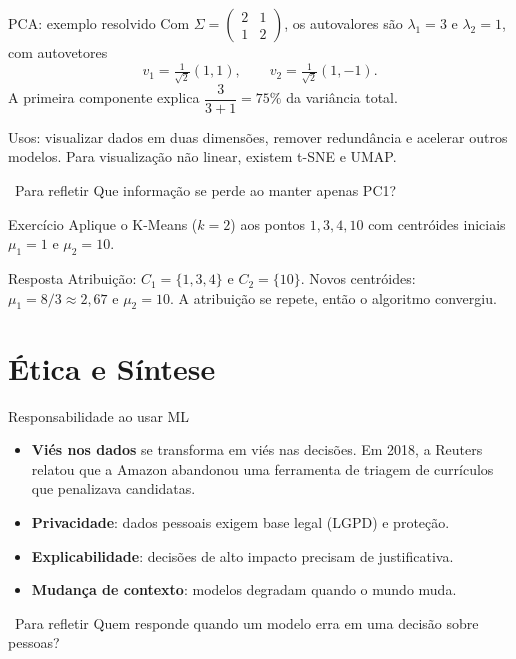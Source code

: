 \documentclass[10pt]{beamer}
\newenvironment{reflexao}{\begin{exampleblock}{\faQuestionCircle\ Para refletir}}{\end{exampleblock}}
\begin{document}
\begin{frame}{PCA: exemplo resolvido}
Com $\Sigma=\begin{pmatrix}2&1\\1&2\end{pmatrix}$, os autovalores são $\lambda_1=3$ e $\lambda_2=1$, com autovetores
\[ v_1=\tfrac{1}{\sqrt2}(1,1), \qquad v_2=\tfrac{1}{\sqrt2}(1,-1). \]
A primeira componente explica $\dfrac{3}{3+1}=75\%$ da variância total.

\vspace{2mm}
\small Usos: visualizar dados em duas dimensões, remover redundância e acelerar outros modelos. Para visualização não linear, existem t-SNE e UMAP.
\begin{reflexao}
\small Que informação se perde ao manter apenas PC1?
\end{reflexao}
\end{frame}

\begin{frame}{Exercício}
Aplique o K-Means ($k=2$) aos pontos $1,3,4,10$ com centróides iniciais $\mu_1=1$ e $\mu_2=10$.

\pause
\begin{block}{Resposta}
Atribuição: $C_1=\{1,3,4\}$ e $C_2=\{10\}$. Novos centróides: $\mu_1=8/3\approx2{,}67$ e $\mu_2=10$. A atribuição se repete, então o algoritmo convergiu.
\end{block}
\end{frame}

\section{Ética e Síntese}

\begin{frame}{Responsabilidade ao usar ML}
\begin{itemize}
 \item \textbf{Viés nos dados} se transforma em viés nas decisões. Em 2018, a Reuters relatou que a Amazon abandonou uma ferramenta de triagem de currículos que penalizava candidatas.
 \item \textbf{Privacidade}: dados pessoais exigem base legal (LGPD) e proteção.
 \item \textbf{Explicabilidade}: decisões de alto impacto precisam de justificativa.
 \item \textbf{Mudança de contexto}: modelos degradam quando o mundo muda.
\end{itemize}
\begin{reflexao}
\small Quem responde quando um modelo erra em uma decisão sobre pessoas?
\end{reflexao}
\end{frame}
\end{document}
